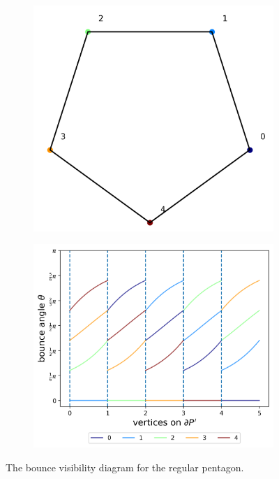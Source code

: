 \documentclass[]{article}  %
\begin{document}
\begin{figure}
\begin{subfigure}{0.25\textwidth}
\centering
\includegraphics[width=0.5\linewidth]{figures/regular_pent.png}
\end{subfigure}%
\begin{subfigure}{0.25\textwidth}
\centering
\includegraphics[width=0.8\linewidth]{figures/regular_pent_bvd.png}
\end{subfigure}
\caption{The bounce visibility diagram for the regular pentagon. }
\label{fig:regular_pent_bvd}
\end{figure}
\end{document}
